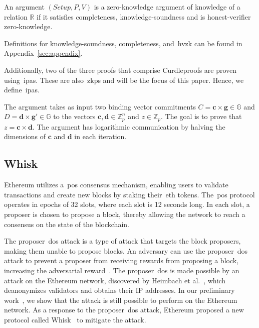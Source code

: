 \begin{definition}
    An argument $(Setup, P, V)$ is a zero-knowledge argument of knowledge of a relation $\mathbb{R}$ if it satisfies completeness, knowledge-soundness and is honest-verifier zero-knowledge.
\end{definition}

Definitions for knowledge-soundness, completeness, and~\gls{hvzk} can be found in Appendix~\ref{sec:appendix}.

Additionally, two of the three proofs that comprise Curdleproofs are proven using~\glspl{ipa}.
These are also~\glspl{zkp} and will be the focus of this paper.
Hence, we define~\glspl{ipa}.

\begin{definition}
    The argument takes as input two binding vector commitments $C=\mathbf{c}\times\mathbf{g}\in\mathbb{G}$ and $D=\mathbf{d}\times\mathbf{g'}\in\mathbb{G}$ to the vectors $\mathbf{c},\mathbf{d}\in\mathbb{Z}_p^n$ and $z\in\mathbb{Z}_p$.
    The goal is to prove that $z=\mathbf{c}\times\mathbf{d}$.
    The argument has logarithmic communication by halving the dimensions of $\mathbf{c}$ and $\mathbf{d}$ in each iteration.
\end{definition}

\subsection{Whisk}\label{subsec:related-work-whisk}
Ethereum utilizes a~\gls{pos} consensus mechanism, enabling users to validate transactions and create new blocks by staking their~\gls{eth} tokens.
The~\gls{pos} protocol operates in epochs of 32 slots, where each slot is 12 seconds long.
In each slot, a proposer is chosen to propose a block, thereby allowing the network to reach a consensus on the state of the blockchain.

The proposer~\gls{dos} attack is a type of attack that targets the block proposers, making them unable to propose blocks.
An adversary can use the proposer~\gls{dos} attack to prevent a proposer from receiving rewards from proposing a block, increasing the adversarial reward~\cite{EthereumSSLE2024}.
The proposer~\gls{dos} is made possible by an attack on the Ethereum network, discovered by Heimbach et al.~\cite{heimbach2024deanonymizingethereumvalidatorsp2p}, which deanonymizes validators and obtains their IP addresses.
In our preliminary work~\cite{ouroldpaper}, we show that the attack is still possible to perform on the Ethereum network.
As a response to the proposer~\gls{dos} attack, Ethereum proposed a new protocol called Whisk~\cite{Whisk2024} to mitigate the attack.

